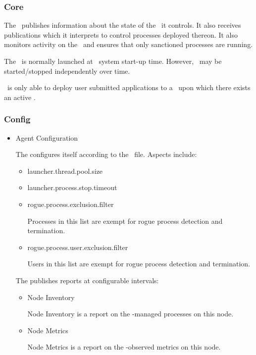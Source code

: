     \subsubsection{Core}    
    
    The \varAgent~publishes information about the state of the
    \varNodeMachineComputer~it controls.
    It also receives publications which it interprets to control
    processes deployed thereon.
    It also monitors activity on the \varNodeMachineComputer~and
    ensures that only sanctioned processes are running.
    
    The \varAgent~is normally launched at \varDUCC~system
    start-up time.
    However, \varAgents~may be started/stopped independently over time.
    
    \varDUCC~is only able to deploy user submitted applications to a
    \varNodeMachineComputer~upon which there exists an active \varAgent.
    
    \subsubsection{Config}     
    
    \begin{itemize}
      \item Agent Configuration
      
      The \varAgent configures itself according to the 
      \varDuccProperties~file.  Aspects include:
      
      \begin{itemize}
        \item launcher.thread.pool.size
        \item launcher.process.stop.timeout
        \item rogue.process.exclusion.filter
        
        Processes in this list are exempt for rogue process detection
        and termination.
        
        \item rogue.process.user.exclusion.filter
        
        Users in this list are exempt for rogue process detection
        and termination.
        
      \end{itemize} 
      
      The \varAgent publishes reports at configurable intervals:
      
      \begin{itemize}
        \item Node Inventory
        
        Node Inventory is a report on the \varAgent-managed processes
        on this node.
        
        \item Node Metrics
        
        Node Metrics is a report on the \varAgent-observed metrics
        on this node.
        
      \end{itemize} 
      
    \end{itemize}  
            
